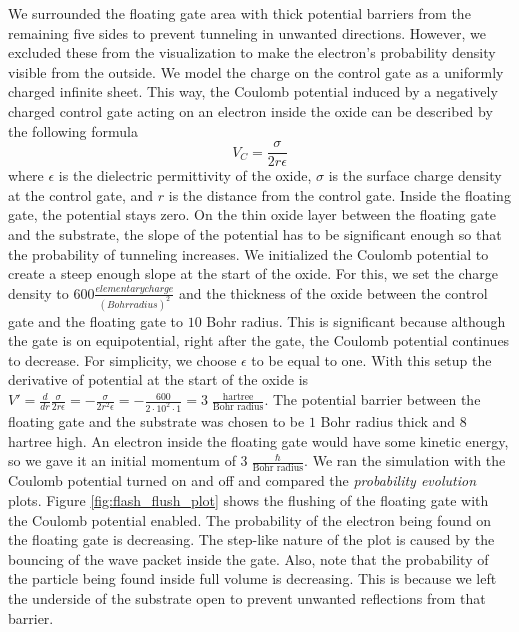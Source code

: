 We surrounded the floating gate area with thick potential barriers from the remaining five sides to prevent tunneling in unwanted directions. However, we excluded these from the visualization to make the electron's probability density visible from the outside.
We model the charge on the control gate as a uniformly charged infinite sheet.
This way, the Coulomb potential induced by a negatively charged control gate acting on an electron inside the oxide can be described by the following formula
\begin{equation}
	\label{eq:coulomb_potential}
	V_C = \frac{\sigma}{2r\epsilon}
\end{equation}
where $\epsilon$ is the dielectric permittivity of the oxide, $\sigma$ is the surface charge density at the control gate, and $r$ is the distance from the control gate.
Inside the floating gate, the potential stays zero.
On the thin oxide layer between the floating gate and the substrate, the slope of the potential has to be significant enough so that the probability of tunneling increases.
We initialized the Coulomb potential to create a steep enough slope at the start of the oxide.
For this, we set the charge density to $600 \frac{elementary charge}{(Bohr radius)^2}$ and the thickness of the oxide between the control gate and the floating gate to $10$ Bohr radius.
This is significant because although the gate is on equipotential, right after the gate, the Coulomb potential continues to decrease.
For simplicity, we choose $\epsilon$ to be equal to one.
With this setup the derivative of potential at the start of the oxide is $V' = \frac{d}{dr}\frac{\sigma}{2r\epsilon} = -\frac{\sigma}{2r^2\epsilon} = -\frac{600}{2\cdot 10^2\cdot 1} = 3\; \frac{\text{hartree}}{\text{Bohr radius}}$.
The potential barrier between the floating gate and the substrate was chosen to be $1$ Bohr radius thick and $8$ hartree high.
An electron inside the floating gate would have some kinetic energy, so we gave it an initial momentum of $3\; \frac{\hbar}{\text{Bohr radius}}$.
We ran the simulation with the Coulomb potential turned on and off and compared the \textit{probability evolution} plots.
Figure \ref{fig:flash_flush_plot} shows the flushing of the floating gate with the Coulomb potential enabled.
The probability of the electron being found on the floating gate is decreasing.
The step-like nature of the plot is caused by the bouncing of the wave packet inside the gate.
Also, note that the probability of the particle being found inside full volume is decreasing.
This is because we left the underside of the substrate open to prevent unwanted reflections from that barrier.
